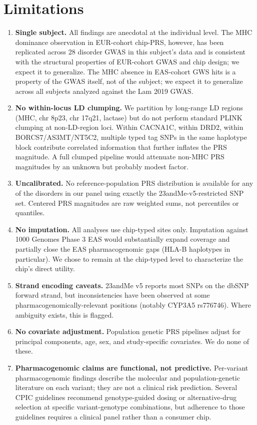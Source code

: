 \documentclass[11pt,a4paper]{article}
\begin{document}
\section{Limitations}

\begin{enumerate}
\item \textbf{Single subject.} All findings are anecdotal at the individual level. The MHC dominance observation in EUR-cohort chip-PRS, however, has been replicated across 28 disorder GWAS in this subject's data and is consistent with the structural properties of EUR-cohort GWAS and chip design; we expect it to generalize. The MHC absence in EAS-cohort GWS hits is a property of the GWAS itself, not of the subject; we expect it to generalize across all subjects analyzed against the Lam 2019 GWAS.
\item \textbf{No within-locus LD clumping.} We partition by long-range LD regions (MHC, chr 8p23, chr 17q21, lactase) but do not perform standard PLINK clumping at non-LD-region loci. Within CACNA1C, within DRD2, within BORCS7/AS3MT/NT5C2, multiple typed tag SNPs in the same haplotype block contribute correlated information that further inflates the PRS magnitude. A full clumped pipeline would attenuate non-MHC PRS magnitudes by an unknown but probably modest factor.
\item \textbf{Uncalibrated.} No reference-population PRS distribution is available for any of the disorders in our panel using exactly the 23andMe-v5-restricted SNP set. Centered PRS magnitudes are raw weighted sums, not percentiles or quantiles.
\item \textbf{No imputation.} All analyses use chip-typed sites only. Imputation against 1000 Genomes Phase 3 EAS would substantially expand coverage and partially close the EAS pharmacogenomic gaps (HLA-B haplotypes in particular). We chose to remain at the chip-typed level to characterize the chip's direct utility.
\item \textbf{Strand encoding caveats.} 23andMe v5 reports most SNPs on the dbSNP forward strand, but inconsistencies have been observed at some pharmacogenomically-relevant positions (notably CYP3A5 rs776746). Where ambiguity exists, this is flagged.
\item \textbf{No covariate adjustment.} Population genetic PRS pipelines adjust for principal components, age, sex, and study-specific covariates. We do none of these.
\item \textbf{Pharmacogenomic claims are functional, not predictive.} Per-variant pharmacogenomic findings describe the molecular and population-genetic literature on each variant; they are not a clinical risk prediction. Several CPIC guidelines recommend genotype-guided dosing or alternative-drug selection at specific variant-genotype combinations, but adherence to those guidelines requires a clinical panel rather than a consumer chip.
\end{enumerate}
\end{document}
